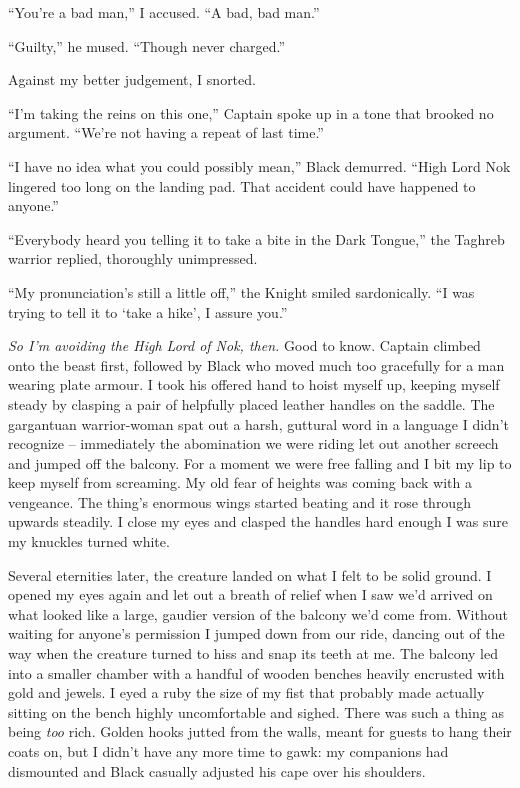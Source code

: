 \documentclass[12pt, openany]{book}
\begin{document}
“You’re a bad man,” I accused. “A bad, bad man.”

“Guilty,” he mused. “Though never charged.”

Against my better judgement, I snorted.

“I’m taking the reins on this one,” Captain spoke up in a tone that brooked no argument. “We’re not having a repeat of last time.”

“I have no idea what you could possibly mean,” Black demurred. “High Lord Nok lingered too long on the landing pad. That accident could have happened to anyone.”

“Everybody heard you telling it to take a bite in the Dark Tongue,” the Taghreb warrior replied, thoroughly unimpressed.

“My pronunciation’s still a little off,” the Knight smiled sardonically. “I was trying to tell it to ‘take a hike’, I assure you.”

\textit{So I’m avoiding the High Lord of Nok, then.} Good to know. Captain climbed onto the beast first, followed by Black who moved much too gracefully for a man wearing plate armour. I took his offered hand to hoist myself up, keeping myself steady by clasping a pair of helpfully placed leather handles on the saddle. The gargantuan warrior-woman spat out a harsh, guttural word in a language I didn’t recognize – immediately the abomination we were riding let out another screech and jumped off the balcony. For a moment we were free falling and I bit my lip to keep myself from screaming. My old fear of heights was coming back with a vengeance. The thing’s enormous wings started beating and it rose through upwards steadily. I close my eyes and clasped the handles hard enough I was sure my knuckles turned white. 

Several eternities later, the creature landed on what I felt to be solid ground. I opened my eyes again and let out a breath of relief when I saw we’d arrived on what looked like a large, gaudier version of the balcony we’d come from. Without waiting for anyone’s permission I jumped down from our ride, dancing out of the way when the creature turned to hiss and snap its teeth at me. The balcony led into a smaller chamber with a handful of wooden benches heavily encrusted with gold and jewels. I eyed a ruby the size of my fist that probably made actually sitting on the bench highly uncomfortable and sighed. There was such a thing as being \textit{too} rich. Golden hooks jutted from the walls, meant for guests to hang their coats on, but I didn’t have any more time to gawk: my companions had dismounted and Black casually adjusted his cape over his shoulders.
\end{document}
